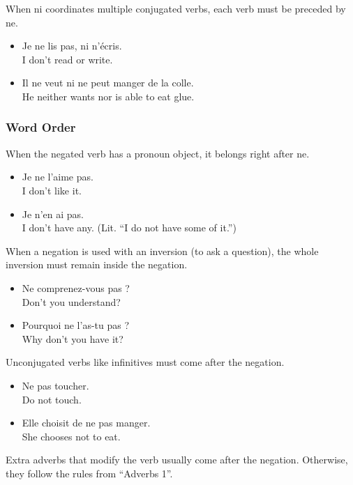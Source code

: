 When ni coordinates multiple conjugated verbs, each verb must be preceded by ne.

\begin{itemize}
  \item  Je ne lis pas, ni n'{\'e}cris. \\ I don't read or write.
  \item  Il ne veut ni ne peut manger de la colle. \\ He neither wants nor is able to eat glue.
\end{itemize}

\subsubsection{Word Order}

When the negated verb has a pronoun object, it belongs right after ne.

\begin{itemize}
  \item  Je ne l'aime pas. \\ I don't like it.
  \item  Je n'en ai pas. \\ I don't have any. (Lit. ``I do not have some of it.'')
\end{itemize}

When a negation is used with an inversion (to ask a question), the whole inversion must remain inside the negation.

\begin{itemize}
  \item  Ne comprenez-vous pas ? \\ Don't you understand?
  \item  Pourquoi ne l'as-tu pas ? \\ Why don't you have it?
\end{itemize}

Unconjugated verbs like infinitives must come after the negation.

\begin{itemize}
  \item  Ne pas toucher. \\ Do not touch.
  \item  Elle choisit de ne pas manger. \\ She chooses not to eat.
\end{itemize}

Extra adverbs that modify the verb usually come after the negation. Otherwise, they follow the rules from ``Adverbs 1''.


